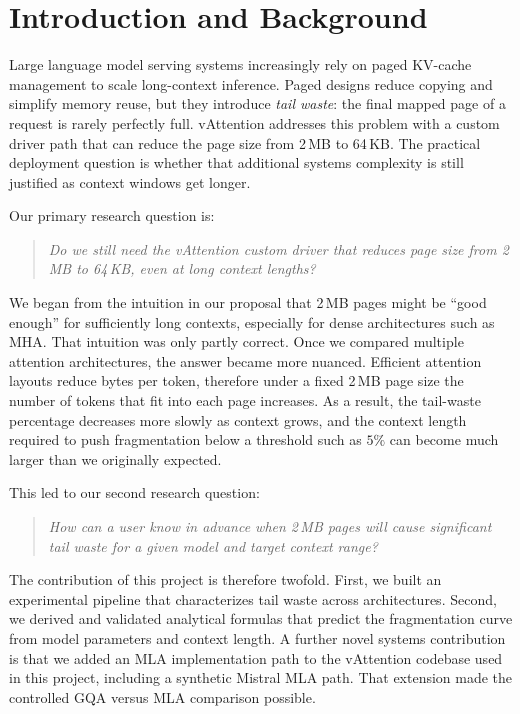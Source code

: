 \documentclass[conference]{IEEEtran}
\begin{document}
\section{Introduction and Background}
Large language model serving systems increasingly rely on paged KV-cache 
management to scale long-context inference. Paged designs reduce copying 
and simplify memory reuse, but they introduce \emph{tail waste}: 
the final mapped page of a request is rarely perfectly full. 
vAttention addresses this problem with a custom driver path that can 
reduce the page size from 2\,MB to 64\,KB. The practical deployment 
question is whether that additional systems complexity is still 
justified as context windows get longer.

Our primary research question is:
\begin{quote}
\emph{Do we still need the vAttention custom driver that reduces page size from 2\,MB to 64\,KB, even at long context lengths?}
\end{quote}

We began from the intuition in our proposal that 2\,MB pages 
might be ``good enough'' for sufficiently long contexts, 
especially for dense architectures such as MHA. That intuition 
was only partly correct. Once we compared multiple attention 
architectures, the answer became more nuanced. Efficient attention 
layouts reduce bytes per token, therefore under a fixed 2\,MB page
size the number of tokens that fit into each page increases. As a result,
the tail-waste percentage decreases more slowly as context grows, and the
context length required to push fragmentation below a threshold such as
$5\%$ can become much larger than we originally expected.

This led to our second research question:
\begin{quote}
\emph{How can a user know in advance when 2\,MB pages will cause significant tail waste for a given model and target context range?}
\end{quote}

The contribution of this project is therefore twofold. 
First, we built an experimental pipeline that characterizes tail waste 
across architectures. Second, we derived and validated analytical 
formulas that predict the fragmentation curve from model parameters 
and context length. A further novel systems contribution is that we 
added an MLA implementation path to the vAttention codebase 
used in this project, including a synthetic Mistral MLA path. 
That extension made the controlled GQA versus MLA comparison possible.
\end{document}
